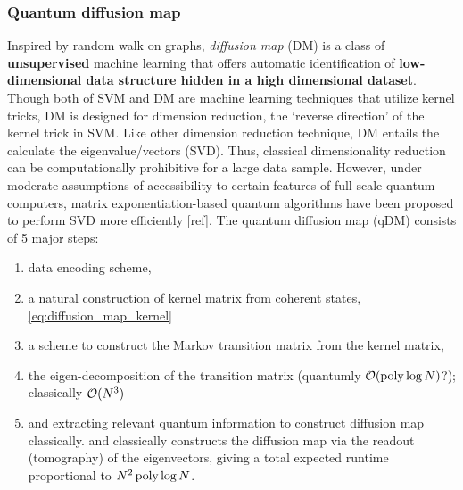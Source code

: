 \subsubsection{Quantum diffusion map}
Inspired by random walk on graphs, \emph{diffusion map} (DM) is a class of \textbf{unsupervised} machine learning that offers automatic identification of \textbf{low-dimensional data structure hidden in a high dimensional dataset}.
Though both of SVM and DM are machine learning techniques that utilize kernel tricks, DM is designed for dimension reduction, the `reverse direction' of the kernel trick in SVM.
Like other dimension reduction technique, DM entails the calculate the eigenvalue/vectors (SVD).
Thus, classical dimensionality reduction can be computationally prohibitive for a large data sample. 
However, under moderate assumptions of accessibility to certain features of full-scale quantum computers, matrix exponentiation-based quantum algorithms have been proposed to perform SVD more efficiently [ref]. 
The quantum diffusion map (qDM) consists of 5 major steps: 
\begin{enumerate}
	\item {} data encoding scheme, 
	\item 
	a natural construction of kernel matrix from coherent states, 
	\cref{eq:diffusion_map_kernel}
	\item 
	a scheme to construct the Markov transition matrix from the kernel matrix, 
	\item 
	the eigen-decomposition of the transition matrix (quantumly $\mathcal{O}(\operatorname{\textup{poly}}\log N)$?); classically $\mathcal{O}(N^3)$
	\item 
	and extracting relevant quantum information to construct diffusion map classically. 
	and classically constructs the diffusion map via the readout (tomography) of the eigenvectors, giving a total expected runtime proportional to $N^2 \operatorname{\textup{poly}}\log N$.
\end{enumerate}
